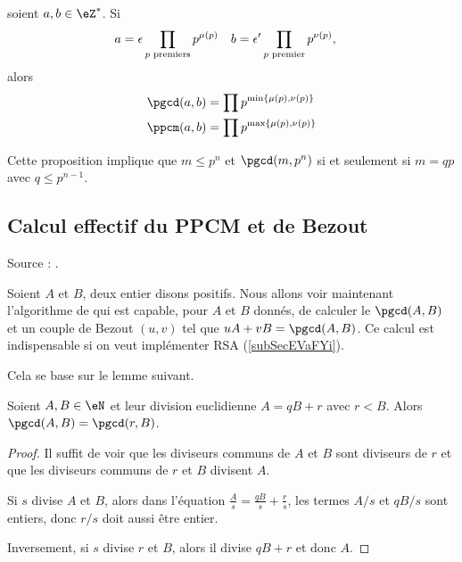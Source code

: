 \begin{proposition}
    soient \( a,b\in\eZ^*\). Si
    \begin{equation}
        \begin{aligned}[]
            a&=\epsilon\prod_{\text{\( p\) premiers}}p^{\mu(p)}&b&=\epsilon'\prod_{\text{\( p\) premier}}p^{\nu(p)},
        \end{aligned}
    \end{equation}
    alors
    \begin{subequations}
        \begin{align}
            \pgcd(a,b)&=\prod p^{\min\{ \mu(p),\nu(p) \}}\\
            \ppcm(a,b)&=\prod p^{\max\{ \mu(p),\nu(p) \}}
        \end{align}
    \end{subequations}    
\end{proposition}

Cette proposition implique que \( m\leq p^n\) et \( \pgcd(m,p^n)\) si et seulement si \( m=qp\) avec \( q\leq p^{n-1}\).

\subsection{Calcul effectif du PPCM et de Bezout}
\label{subSecIpmnhO}

Source : \cite{BezoutCos}.

Soient \( A\) et \( B\), deux entier disons positifs. Nous allons voir maintenant l'algorithme de  qui est capable, pour \( A\) et \( B\) donnés, de calculer le \( \pgcd(A,B)\) et un couple de Bezout \( (u,v)\) tel que \( uA+vB=\pgcd(A,B)\). Ce calcul est indispensable si on veut implémenter RSA (\ref{subSecEVaFYi}).

Cela se base sur le lemme suivant.

\begin{lemma}       \label{LemiVqita}
    Soient \( A,B\in \eN\) et leur division euclidienne \( A=qB+r\) avec \( r<B\). Alors \( \pgcd(A,B)=\pgcd(r,B)\).
\end{lemma}

\begin{proof}
    Il suffit de voir que les diviseurs communs de \( A\) et \( B\) sont diviseurs de \( r\) et que les diviseurs communs de \( r\) et \( B\) divisent \( A\).

    Si \( s\) divise \( A\) et \( B\), alors dans l'équation \( \frac{ A }{ s }=\frac{ qB }{ s }+\frac{ r }{ s }\), les termes \( A/s\) et \( qB/s\) sont entiers, donc \( r/s\) doit aussi être entier.

    Inversement, si \( s\) divise \( r\) et \( B\), alors il divise \( qB+r\) et donc \( A\).
\end{proof}

